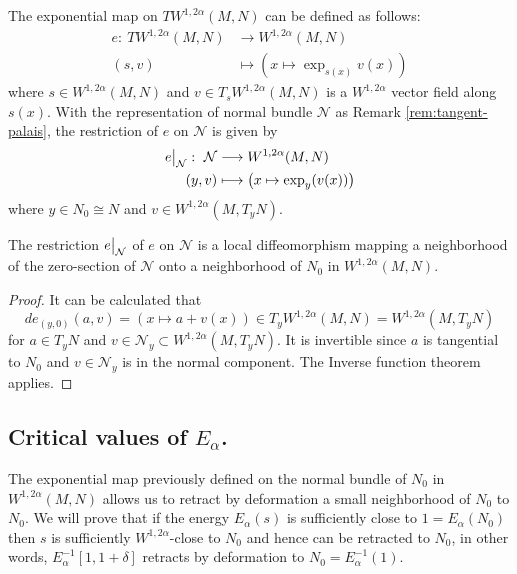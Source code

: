 The exponential map on \(TW^{1,2\alpha}(M,N)\) can be defined as follows:
\begin{align*}
  e:\ TW^{1,2\alpha}(M,N) & \longrightarrow W^{1,2\alpha}(M,N)\\
  (s,v) 		  &\longmapsto \left(x\mapsto \exp_{s(x)}v(x) \right)
\end{align*}
where \(s\in W^{1,2\alpha}(M,N)\) and \(v\in T_s W^{1,2\alpha}(M,N)\) is a \(W^{1,2\alpha}\) vector field along \(s(x)\). With the representation of normal bundle
\(\mathcal{N}\) as Remark \ref{rem:tangent-palais}, the restriction of \(e\) on \(\mathcal{N}\) is given by
\begin{align*}
\restr{e}{\mathcal{N}}:\ \mathcal{N} &\longrightarrow  W^{1,2\alpha}(M,N)\\
			 (y,v) &\longmapsto	       \left(x\mapsto \exp_y (v(x)) \right)
\end{align*}
where \(y\in N_0 \cong N\) and \(v \in W^{1,2\alpha}(M, T_yN)\).

\begin{lemma}
\label{lem:local-isom-e}
The restriction \(\restr{e}{\mathcal{N}}\) of \(e\) on \(\mathcal{N}\) is a local
diffeomorphism mapping a neighborhood of the zero-section of \(\mathcal{N}\) onto a
neighborhood of \(N_0\) in \(W^{1,2\alpha}(M,N)\).
\end{lemma}
\begin{proof}
It can be calculated that 
\[
  de_{(y,0)}(a,v) = \left(x\mapsto a + v(x)\right) \in T_yW^{1,2\alpha}(M,N) =
W^{1,2\alpha}(M, T_yN)
\]
for \(a\in T_y N\) and \(v\in \mathcal{N}_y \subset W^{1,2\alpha}(M, T_y N)\). It
is invertible since \(a\) is tangential to \(N_0\) and \(v\in \mathcal{N}_y\) is
in the normal component. The Inverse function theorem applies.
\end{proof}

\subsection{Critical values of \(E_\alpha\).}
\label{sec:orgb66d183}

The exponential map previously defined on the normal bundle of \(N_0\) in  \(W^{1,
2\alpha}(M,N)\) allows us to retract by deformation a small neighborhood of \(N_0\) to
\(N_0\). We will prove that if the energy \(E_\alpha(s)\) is sufficiently close to \(1=E_\alpha(N_0)\) then \(s\) is sufficiently \(W^{1,2\alpha}\)-close to \(N_0\) and hence can be retracted to \(N_0\), in other words, \(E_\alpha^{-1}[1, 1+\delta]\) retracts by deformation to \(N_0 = E_\alpha^{-1}(1)\).

